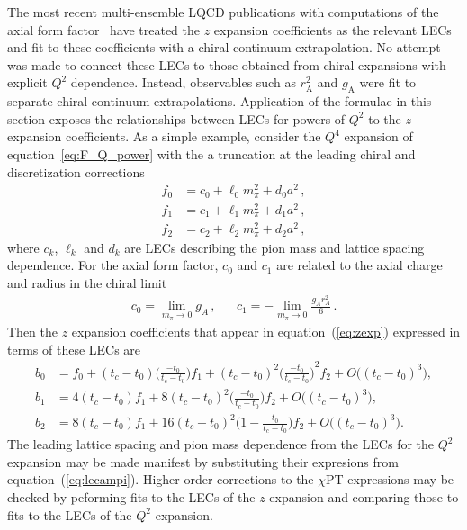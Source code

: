 \documentclass{ar-1col}
\begin{document}
The most recent multi-ensemble LQCD publications with computations
 of the axial form factor~\cite{Park:2021ypf,RQCD:2019jai}
 have treated the $z$ expansion coefficients as the relevant LECs
 and fit to these coefficients with a chiral-continuum extrapolation.
No attempt was made to connect these LECs to those obtained
 from chiral expansions with explicit $Q^2$ dependence.
Instead, observables such as $r_{\mathrm{A}}^2$ and $g_{\mathrm{A}}$
 were fit to separate chiral-continuum extrapolations.
Application of the formulae in this section exposes the relationships
 between LECs for powers of $Q^2$ to the $z$ expansion coefficients.
As a simple example, consider the $Q^4$ expansion of equation~\eqref{eq:F_Q_power} with
the a truncation at the leading chiral and discretization corrections
\begin{align}
f_0 &= c_0 + \ell_0 m_\pi^2 + d_0 a^2\, ,
\nonumber\\
f_1 &= c_1 + \ell_1 m_\pi^2 + d_1 a^2\, ,
\nonumber\\
f_2 &= c_2 + \ell_2 m_\pi^2 + d_2 a^2\, ,
\label{eq:lecampi}
\end{align}
where $c_k$, $\ell_k$ and $d_k$ are LECs describing the pion mass and lattice spacing dependence.
For the axial form factor, $c_0$ and $c_1$ are related to the axial charge and radius in the chiral limit
\begin{align}
&c_0 = \lim_{m_\pi\rightarrow0} g_A\, ,&
&c_1 = -\lim_{m_\pi\rightarrow0} \frac{g_A r_A^2}{6}\, .&
\end{align}
Then the $z$ expansion coefficients that appear in equation~(\ref{eq:zexp})
 expressed in terms of these LECs are
\newcommand{\tctza}{\ensuremath{(t_c-t_0)}}
\newcommand{\tctzb}{\ensuremath{\Big(\frac{-t_0}{t_c-t_0}\Big)}}
\begin{align}\label{eq:z_coeff_xpt}
b_0 &= f_0 +\tctza \tctzb f_1 +\tctza^2 \tctzb^2 f_2 +O\big(\tctza^3\big),
\nonumber\\
b_1 &= 4 \tctza f_1 +8 \tctza^2 \tctzb f_2 +O\big(\tctza^3\big),
\nonumber\\
b_2 &= 8 \tctza f_1 +16 \tctza^2 \Big(1 -\frac{t_0}{t_c-t_0}\Big) f_2 +O\big(\tctza^3\big).
\end{align}
The leading lattice spacing and pion mass dependence from
 the LECs for the $Q^2$ expansion may be made manifest
 by substituting their expresions from equation~(\ref{eq:lecampi}).
Higher-order corrections to the $\chi$PT expressions may be checked
 by peforming fits to the LECs of the $z$ expansion and comparing those
 to fits to the LECs of the $Q^2$ expansion.
\end{document}
